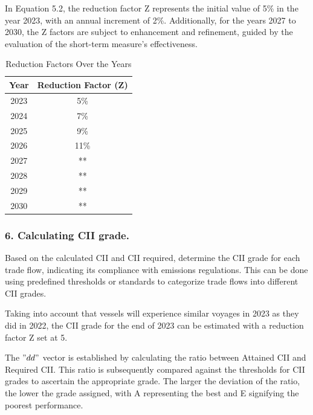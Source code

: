 In Equation 5.2, the reduction factor Z represents the initial value of 5\% in the year 2023,
with an annual increment of 2\%. Additionally, for the years 2027 to 2030,
the Z factors are subject to enhancement and refinement, guided by the evaluation of the short-term measure's effectiveness.

\newpage

\begin{table}[htbp]
    \centering
    \begin{tabular}{cc}
        \toprule
        Year & Reduction Factor (Z) \\
        \midrule
        2023 & 5\%                  \\
        2024 & 7\%                  \\
        2025 & 9\%                  \\
        2026 & 11\%                 \\
        2027 & **                   \\
        2028 & **                   \\
        2029 & **                   \\
        2030 & **                   \\
        \bottomrule
    \end{tabular}
    \caption{Reduction Factors Over the Years}
    \label{tab:reduction-factors}
\end{table}

\subsubsection{6. Calculating CII grade.}

Based on the calculated CII and CII required, determine the CII grade for each trade flow, indicating its compliance with emissions regulations.
This can be done using predefined thresholds or standards to categorize trade flows into different CII grades.

Taking into account that vessels will experience similar voyages in 2023 as they did in 2022, the CII grade for the end of 2023 can be estimated with a reduction factor Z set at 5.

The $"dd"$ vector is established by calculating the ratio between Attained CII and Required CII.
This ratio is subsequently compared against the thresholds for CII grades to ascertain the appropriate grade.
The larger the deviation of the ratio, the lower the grade assigned, with A representing the best and E signifying the poorest performance.



